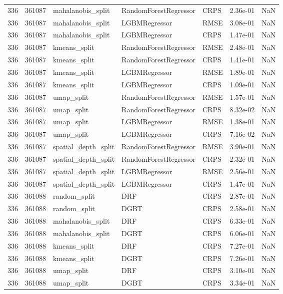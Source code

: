 \begin{tabular}{rrlllrr}
336 & 361087 & mahalanobis\_split & RandomForestRegressor & CRPS & 2.36e-01 & NaN \\
336 & 361087 & mahalanobis\_split & LGBMRegressor & RMSE & 3.08e-01 & NaN \\
336 & 361087 & mahalanobis\_split & LGBMRegressor & CRPS & 1.47e-01 & NaN \\
336 & 361087 & kmeans\_split & RandomForestRegressor & RMSE & 2.48e-01 & NaN \\
336 & 361087 & kmeans\_split & RandomForestRegressor & CRPS & 1.41e-01 & NaN \\
336 & 361087 & kmeans\_split & LGBMRegressor & RMSE & 1.89e-01 & NaN \\
336 & 361087 & kmeans\_split & LGBMRegressor & CRPS & 1.09e-01 & NaN \\
336 & 361087 & umap\_split & RandomForestRegressor & RMSE & 1.57e-01 & NaN \\
336 & 361087 & umap\_split & RandomForestRegressor & CRPS & 8.32e-02 & NaN \\
336 & 361087 & umap\_split & LGBMRegressor & RMSE & 1.38e-01 & NaN \\
336 & 361087 & umap\_split & LGBMRegressor & CRPS & 7.16e-02 & NaN \\
336 & 361087 & spatial\_depth\_split & RandomForestRegressor & RMSE & 3.90e-01 & NaN \\
336 & 361087 & spatial\_depth\_split & RandomForestRegressor & CRPS & 2.32e-01 & NaN \\
336 & 361087 & spatial\_depth\_split & LGBMRegressor & RMSE & 2.56e-01 & NaN \\
336 & 361087 & spatial\_depth\_split & LGBMRegressor & CRPS & 1.47e-01 & NaN \\
336 & 361088 & random\_split & DRF & CRPS & 2.87e-01 & NaN \\
336 & 361088 & random\_split & DGBT & CRPS & 2.58e-01 & NaN \\
336 & 361088 & mahalanobis\_split & DRF & CRPS & 6.33e-01 & NaN \\
336 & 361088 & mahalanobis\_split & DGBT & CRPS & 6.06e-01 & NaN \\
336 & 361088 & kmeans\_split & DRF & CRPS & 7.27e-01 & NaN \\
336 & 361088 & kmeans\_split & DGBT & CRPS & 7.26e-01 & NaN \\
336 & 361088 & umap\_split & DRF & CRPS & 3.10e-01 & NaN \\
336 & 361088 & umap\_split & DGBT & CRPS & 3.34e-01 & NaN \\

\end{tabular}

